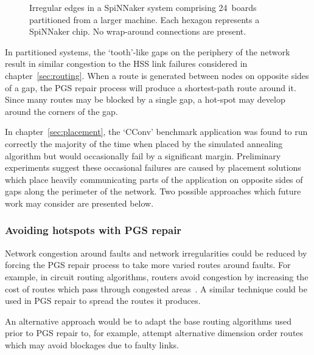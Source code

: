 			\begin{figure}
				\center
				
				\caption[The irregular edges of a partitioned SpiNNaker system.]%
				{Irregular edges in a SpiNNaker system comprising 24~boards
				partitioned from a larger machine.  Each hexagon represents a SpiNNaker
				chip. No wrap-around connections are present.}
				\label{fig:spalloc-mesh}
			\end{figure}
			
			In partitioned systems, the `tooth'-like gaps on the periphery of the
			network result in similar congestion to the HSS link failures considered
			in chapter~\ref{sec:routing}. When a route is generated between nodes on
			opposite sides of a gap, the PGS repair process will produce a
			shortest-path route around it. Since many routes may be blocked by a
			single gap, a hot-spot may develop around the corners of the gap.
			
			In chapter~\ref{sec:placement}, the `CConv' benchmark application was
			found to run correctly the majority of the time when placed by the
			simulated annealing algorithm but would occasionally fail by a
			significant margin. Preliminary experiments suggest these occasional
			failures are caused by placement solutions which place heavily
			communicating parts of the application on opposite sides of gaps along
			the perimeter of the network. Two possible approaches which future work
			may consider are presented below.
			
			\subsubsection{Avoiding hotspots with PGS repair}
				
				\label{sec:pgs-repair-improvements}	
				
				Network congestion around faults and network irregularities could be
				reduced by forcing the PGS repair process to take more varied routes
				around faults. For example, in circuit routing algorithms, routers
				avoid congestion by increasing the cost of routes which pass through
				congested areas~\cite{kahng11}. A similar technique could be used in
				PGS repair to spread the routes it produces.
				
				An alternative approach would be to adapt the base routing algorithms
				used prior to PGS repair to, for example, attempt alternative dimension
				order routes which may avoid blockages due to faulty links.
			
